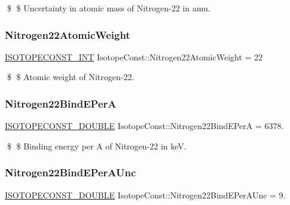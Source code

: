 \$ \$ Uncertainty in atomic mass of Nitrogen-\/22 in amu. \mbox{\label{group___isotope_const-_nitrogen-_n22_ga77102ea5ce51e5b82e513319731e4d54}} 
\subsubsection{\texorpdfstring{Nitrogen22\+Atomic\+Weight}{Nitrogen22AtomicWeight}}
{\footnotesize\ttfamily \mbox{\hyperlink{group___isotope_const-_macros_ga5f18360b3e99483a35c32d789e62621c}{I\+S\+O\+T\+O\+P\+E\+C\+O\+N\+S\+T\+\_\+\+I\+NT}} Isotope\+Const\+::\+Nitrogen22\+Atomic\+Weight = 22}

\$ \$ Atomic weight of Nitrogen-\/22. \mbox{\label{group___isotope_const-_nitrogen-_n22_ga5b26644c4e1358dde2a237a975e6c043}} 
\subsubsection{\texorpdfstring{Nitrogen22\+Bind\+E\+PerA}{Nitrogen22BindEPerA}}
{\footnotesize\ttfamily \mbox{\hyperlink{group___isotope_const-_macros_ga8f45a7272ce02c0b4c65c44636ed719a}{I\+S\+O\+T\+O\+P\+E\+C\+O\+N\+S\+T\+\_\+\+D\+O\+U\+B\+LE}} Isotope\+Const\+::\+Nitrogen22\+Bind\+E\+PerA = 6378.}

\$ \$ Binding energy per A of Nitrogen-\/22 in keV. \mbox{\label{group___isotope_const-_nitrogen-_n22_gaa791fcdc50985604e91845bb65e93c1f}} 
\subsubsection{\texorpdfstring{Nitrogen22\+Bind\+E\+Per\+A\+Unc}{Nitrogen22BindEPerAUnc}}
{\footnotesize\ttfamily \mbox{\hyperlink{group___isotope_const-_macros_ga8f45a7272ce02c0b4c65c44636ed719a}{I\+S\+O\+T\+O\+P\+E\+C\+O\+N\+S\+T\+\_\+\+D\+O\+U\+B\+LE}} Isotope\+Const\+::\+Nitrogen22\+Bind\+E\+Per\+A\+Unc = 9.}

